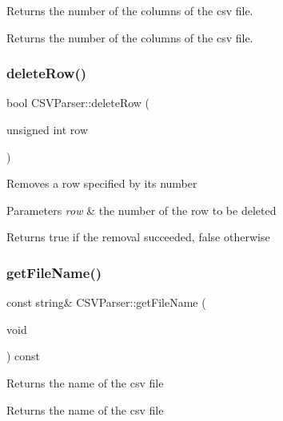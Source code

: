 Returns the number of the columns of the csv file. \begin{DoxyReturn}{Returns}
the number of the columns of the csv file. 
\end{DoxyReturn}
\mbox{\label{class_c_s_v_parser_a1bc14d9edecb802c19ad25bd5cab23b3}} 
\subsubsection{\texorpdfstring{deleteRow()}{deleteRow()}}
{\footnotesize\ttfamily bool C\+S\+V\+Parser\+::delete\+Row (\begin{DoxyParamCaption}\item[{unsigned int}]{row }\end{DoxyParamCaption})}

Removes a row specified by its number 
\begin{DoxyParams}{Parameters}
{\em row} & the number of the row to be deleted \\
\hline
\end{DoxyParams}
\begin{DoxyReturn}{Returns}
true if the removal succeeded, false otherwise 
\end{DoxyReturn}
\mbox{\label{class_c_s_v_parser_ad9a559d1c8de2a7d88a18170c9e11b80}} 
\subsubsection{\texorpdfstring{getFileName()}{getFileName()}}
{\footnotesize\ttfamily const string\& C\+S\+V\+Parser\+::get\+File\+Name (\begin{DoxyParamCaption}\item[{void}]{ }\end{DoxyParamCaption}) const}

Returns the name of the csv file \begin{DoxyReturn}{Returns}
the name of the csv file 
\end{DoxyReturn}
\mbox{\label{class_c_s_v_parser_a95b7d4b188facfec7ebab65413f0130b}} 
